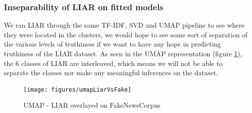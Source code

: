 \subsubsection{Inseparability of LIAR on fitted models}
We ran LIAR through the same TF-IDF, SVD and UMAP pipeline to see where they were located in the clusters, we would hope
to see some sort of separation of the various levels of truthiness if we want to have any hope in predicting truthiness
of the LIAR dataset. As seen in the UMAP representation (figure \ref{fig:liarvsfake}), the 6 classes of LIAR are interleaved, which means we will not be able to separate the classes nor make any meaningful inferences on the dataset.

\begin{figure}[htpb]
  \centering
  \texttt{[image: figures/umapLiarVsFake]}
  \caption{UMAP - LIAR overlayed on FakeNewsCorpus}
  \label{fig:liarvsfake}
\end{figure}

